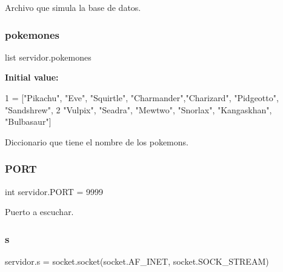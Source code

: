 Archivo que simula la base de datos. 

\mbox{\label{namespaceservidor_ad51227f75b32d668586bfc7516a1d140}} 
\subsubsection{\texorpdfstring{pokemones}{pokemones}}
{\footnotesize\ttfamily list servidor.\+pokemones}

{\bfseries Initial value\+:}
\begin{DoxyCode}
1 =  [\textcolor{stringliteral}{"Pikachu"}, \textcolor{stringliteral}{"Eve"}, \textcolor{stringliteral}{"Squirtle"}, \textcolor{stringliteral}{"Charmander"},\textcolor{stringliteral}{"Charizard"}, \textcolor{stringliteral}{"Pidgeotto"}, \textcolor{stringliteral}{"Sandshrew"}, 
2                  \textcolor{stringliteral}{"Vulpix"}, \textcolor{stringliteral}{"Seadra"}, \textcolor{stringliteral}{"Mewtwo"}, \textcolor{stringliteral}{"Snorlax"}, \textcolor{stringliteral}{"Kangaskhan"}, \textcolor{stringliteral}{"Bulbasaur"}]
\end{DoxyCode}


Diccionario que tiene el nombre de los pokemons. 

\mbox{\label{namespaceservidor_abc87a53cb2df8d9c399e979b4dbd45fa}} 
\subsubsection{\texorpdfstring{P\+O\+RT}{PORT}}
{\footnotesize\ttfamily int servidor.\+P\+O\+RT = 9999}



Puerto a escuchar. 

\mbox{\label{namespaceservidor_ad669abe2ca77beb8398dc4bee9e84daa}} 
\subsubsection{\texorpdfstring{s}{s}}
{\footnotesize\ttfamily servidor.\+s = socket.\+socket(socket.\+A\+F\+\_\+\+I\+N\+ET, socket.\+S\+O\+C\+K\+\_\+\+S\+T\+R\+E\+AM)}



